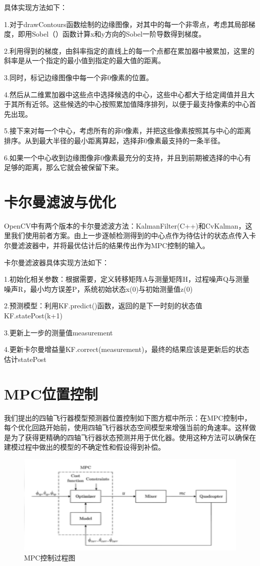 具体实现方法如下：

1.对于drawContours函数绘制的边缘图像，对其中的每⼀个非零点，考虑其局部梯度，即用Sobel（）函数计算x和y方向的Sobel⼀阶导数得到梯度。

2.利用得到的梯度，由斜率指定的直线上的每⼀个点都在累加器中被累加，这⾥的斜率是从⼀个指定的最小值到指定的最大值的距离。

3.同时，标记边缘图像中每⼀个非0像素的位置。

4.然后从二维累加器中这些点中选择候选的中心，这些中心都大于给定阈值并且⼤于其所有近邻。这些候选的中⼼按照累加值降序排列，以便于最支持像素的中心首先出现。

5.接下来对每⼀个中心，考虑所有的非0像素，并把这些像素按照其与中心的距离排序。从到最大半径的最小距离算起，选择非0像素最支持的⼀条半径。

6.如果⼀个中心收到边缘图像⾮0像素最充分的支持，并且到前期被选择的中心有足够的距离，那么它就会被保留下来。

\section{卡尔曼滤波与优化}

OpenCV中有两个版本的卡尔曼滤波方法：KalmanFilter(C++)和CvKalman，这里我们使用前者方案。由上一步逐帧检测得到的中心点作为待估计的状态点传入卡尔曼滤波器中，并将最优估计后的结果传出作为MPC控制的输入。

卡尔曼滤波器具体实现方法如下：

1.初始化相关参数：根据需要，定义转移矩阵A与测量矩阵H，过程噪声Q与测量噪声R，最小均方误差P，系统初始状态x(0)与初始测量值z(0)

2.预测模型：利用KF.predict()函数，返回的是下一时刻的状态值KF.statePost(k+1)

3.更新上一步的测量值measurement

4.更新卡尔曼增益量KF.correct(measurement)，最终的结果应该是更新后的状态估计statePost

\section{MPC位置控制}

我们提出的四轴飞行器模型预测器位置控制如下图方框中所示：在MPC控制中，每个优化回路开始前，使用四轴飞行器状态空间模型来增强当前的角速率。这样做是为了获得更精确的四轴飞行器状态预测并用于优化器。使用这种方法可以确保在建模过程中做出的模型的不确定性和假设得到补偿。

\begin{figure}[ht]
  \centering
  \includegraphics[width=0.8\linewidth]{./Figure/MPC-Diagram.png}
  \caption{MPC控制过程图}\label{Fig:xd1}
\end{figure}

